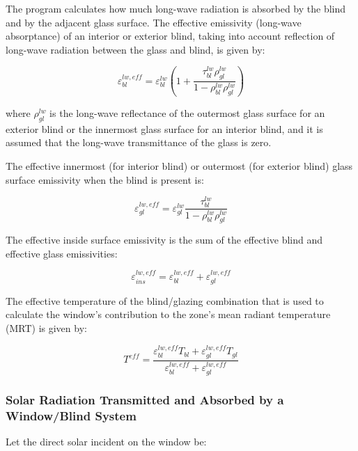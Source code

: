 The program calculates how much long-wave radiation is absorbed by the blind and by the adjacent glass surface. The effective emissivity (long-wave absorptance) of an interior or exterior blind, taking into account reflection of long-wave radiation between the glass and blind, is given by:

\begin{equation}
\varepsilon_{bl}^{lw,eff} = \varepsilon_{bl}^{lw}\left( {1 + \frac{{\tau_{bl}^{lw}\rho_{gl}^{lw}}}{{1 - \rho_{bl}^{lw}\rho_{gl}^{lw}}}} \right)
\end{equation}

where \(\rho_{gl}^{lw}\) is the long-wave reflectance of the outermost glass surface for an exterior blind or the innermost glass surface for an interior blind, and it is assumed that the long-wave transmittance of the glass is zero.

The effective innermost (for interior blind) or outermost (for exterior blind) glass surface emissivity when the blind is present is:

\begin{equation}
\varepsilon_{gl}^{lw,eff} = \varepsilon_{gl}^{lw}\frac{{\tau_{bl}^{lw}}}{{1 - \rho_{bl}^{lw}\rho_{gl}^{lw}}}
\end{equation}

The effective inside surface emissivity is the sum of the effective blind and effective glass emissivities:

\begin{equation}
\varepsilon_{ins}^{lw,eff} = \varepsilon_{bl}^{lw,eff} + \varepsilon_{gl}^{lw,eff}
\end{equation}

The effective temperature of the blind/glazing combination that is used to calculate the window's contribution to the zone's mean radiant temperature (MRT) is given by:

\begin{equation}
T_{}^{eff} = \frac{{\varepsilon_{bl}^{lw,eff}{T_{bl}} + \varepsilon_{gl}^{lw,eff}{T_{gl}}}}{{\varepsilon_{bl}^{lw,eff} + \varepsilon_{gl}^{lw,eff}}}
\end{equation}

\subsubsection{Solar Radiation Transmitted and Absorbed by a Window/Blind System}\label{solar-radiation-transmitted-and-absorbed-by-a-windowblind-system}

Let the direct solar incident on the window be:


